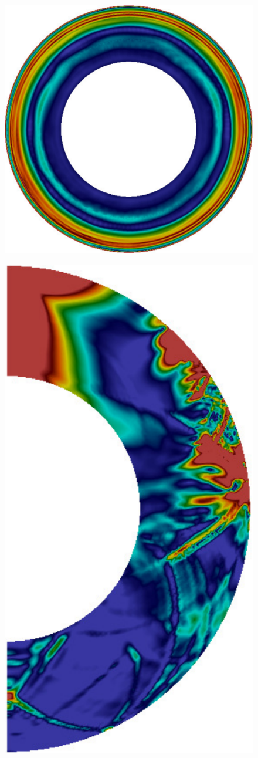 \documentclass[extra,referee]{gji}
\begin{document}
\begin{figure}
\begin{minipage}{0.6\textwidth}
\begin{minipage}{.585\textwidth}
      \includegraphics[height=.9\textwidth]{fig/snapshot/3d-phi.pdf}
      \label{fig:3deq}  
    \end{minipage}
    \begin{minipage}{.39\textwidth}
      \centering
      \vspace{1em}
      \includegraphics[height=1.35\textwidth]{fig/snapshot/3d-slice.pdf}

\end{minipage}
\end{minipage}
\end{figure}
\end{document}

